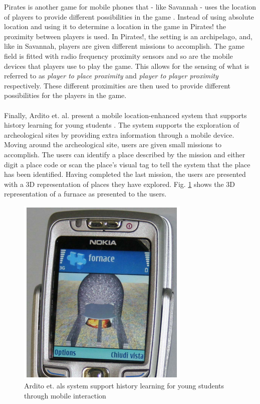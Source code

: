 \noindent Pirates is another game for mobile phones that - like Savannah - uses the location of players to provide different possibilities in the game \cite{Falk:2001:PPI:634067.634140}. Instead of using absolute location and using it to determine a location in the game in Pirates! the proximity between players is used. In Pirates!, the setting is an archipelago, and, like in Savannah, players are given different missions to accomplish. The game field is fitted with radio frequency proximity sensors and so are the mobile devices that players use to play the game. This allows for the sensing of what is referred to as \emph{player to place proximity} and \emph{player to player proximity} respectively. These different proximities are then used to provide different possibilities for the players in the game.
\\\\
Finally, Ardito et. al. present a mobile location-enhanced system that supports history learning for young students \cite{4351331}. The system supports the exploration of archeological sites by providing extra information through a mobile device. Moving around the archeological site, users are given small missions to accomplish. The users can identify a place described by the mission and either digit a place code or scan the place's visual tag to tell the system that the place has been identified. Having completed the last mission, the users are presented with a 3D representation of places they have explored. Fig. \ref{fig:ardito} shows the 3D representation of a furnace as presented to the users.
\\

\begin{figure}
	\centering
	\includegraphics[scale=0.6]{fig/ardito}
	\caption{Ardito et. als \cite{4351331} system support history learning for young students through mobile interaction}
	\label{fig:ardito}
\end{figure}

